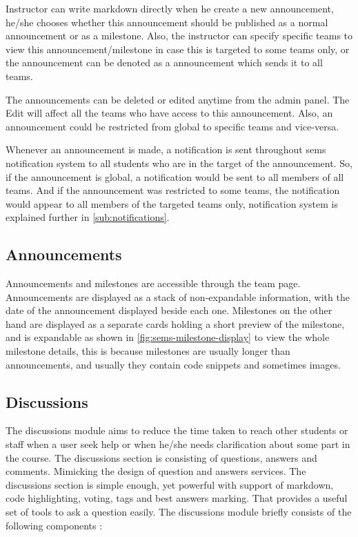 \newParagraph
Instructor can write markdown directly when he create a new announcement, he/she chooses whether this announcement should be published
as a normal announcement or as a milestone. Also, the instructor can specify specific teams to view this announcement/milestone in case
this is targeted to some teams only, or the announcement can be denoted as a  announcement which sends it to all
teams.

\newParagraph
The announcements can be deleted or edited anytime from the admin panel. The Edit will affect all the teams who have access to this announcement.
Also, an announcement could be restricted from global to specific teams and vice-versa.

\newParagraph
Whenever an announcement is made, a notification is sent throughout \ac{sems} notification system to all students who are in the target
of the announcement. So, if the announcement is global, a notification would be sent to all members of all teams. And if the announcement
was restricted to some teams, the notification would appear to all members of the targeted teams only, notification system is explained further in
\ref{sub:notifications}.

\subsection{Announcements}
\label{sub:announcements}
Announcements and milestones are accessible through the team page. Announcements are displayed as a stack of non-expandable information,
with the date of the announcement displayed beside each one. Milestones on the other hand are
displayed as a separate cards holding a short preview of the milestone, and is expandable as shown in \ref{fig:sems-milestone-display} to view
the whole milestone details, this is because milestones are usually longer than announcements, and usually they contain code snippets and sometimes
images.


\subsection{Discussions}
\label{sub:discussions}
The discussions module aims to reduce the time taken to reach other students or staff when a user seek help or when he/she needs
clarification about some part in the course. The discussions section is consisting of questions, answers and comments. Mimicking the
design of question and answers services. The discussions section is simple enough, yet powerful with support of markdown, code highlighting, voting, tags and
best answers marking. That provides a useful set of tools to ask a question easily. The discussions module briefly consists of the following components :

